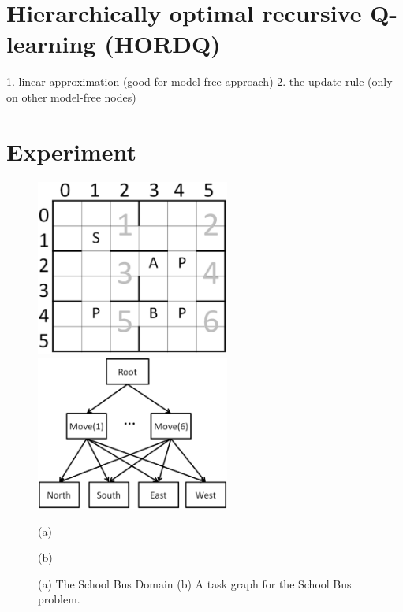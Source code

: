 \documentclass{article} %
\begin{document}
\section{Hierarchically optimal recursive Q-learning (HORDQ)}
1. linear approximation (good for model-free approach)
2. the update rule (only on other model-free nodes)


\section{Experiment}

\begin{figure}[h]
 \begin{minipage}[b]{0.5\linewidth}
    \includegraphics[width=2.5in] {BusSmall.eps}
\end{minipage}
\begin{minipage}[b]{0.5\linewidth}
    \includegraphics[width=2.5in] {BusHierarchy.eps}
\end{minipage}
\begin{minipage}[b]{0.5\linewidth} \centering (a) \end{minipage}
\begin{minipage}[b]{0.5\linewidth} \centering (b) \end{minipage}

\caption{(a) The School Bus Domain (b) A task graph for the School Bus problem.}
\label{fig:bus}
\end{figure}
\end{document}
